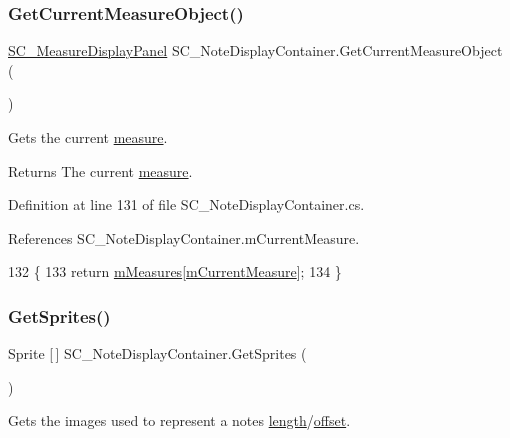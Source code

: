 \subsubsection{\texorpdfstring{Get\+Current\+Measure\+Object()}{GetCurrentMeasureObject()}}
{\footnotesize\ttfamily \hyperlink{class_s_c___measure_display_panel}{S\+C\+\_\+\+Measure\+Display\+Panel} S\+C\+\_\+\+Note\+Display\+Container.\+Get\+Current\+Measure\+Object (\begin{DoxyParamCaption}{ }\end{DoxyParamCaption})}



Gets the current \hyperlink{group___doc_s_c___m_d_p}{measure}. 

\begin{DoxyReturn}{Returns}
The current \hyperlink{group___doc_s_c___m_d_p}{measure}. 
\end{DoxyReturn}


Definition at line 131 of file S\+C\+\_\+\+Note\+Display\+Container.\+cs.



References S\+C\+\_\+\+Note\+Display\+Container.\+m\+Current\+Measure.


\begin{DoxyCode}
132     \{
133         \textcolor{keywordflow}{return} \hyperlink{group___s_c___n_d_c_priv_var_gaa072fb53f6bd6646bc85f2ebc2a02229}{mMeasures}[\hyperlink{group___s_c___n_d_c_priv_var_ga28ce2bf8358c9f686b5b9e362aa96dff}{mCurrentMeasure}];
134     \}
\end{DoxyCode}
\mbox{\label{group___s_c___n_d_c_pub_func_ga3cdbb1068cd6511112c564fc636c56ca}} 
\subsubsection{\texorpdfstring{Get\+Sprites()}{GetSprites()}}
{\footnotesize\ttfamily Sprite \mbox{[}$\,$\mbox{]} S\+C\+\_\+\+Note\+Display\+Container.\+Get\+Sprites (\begin{DoxyParamCaption}{ }\end{DoxyParamCaption})}



Gets the images used to represent a note\textquotesingle{}s \hyperlink{group___music_structs_ac35cd02f5b3c00e3040b51e40e9e6c94}{length}/\hyperlink{group___music_structs_ae281187907aed4c728c7981300dbebaf}{offset}. 

